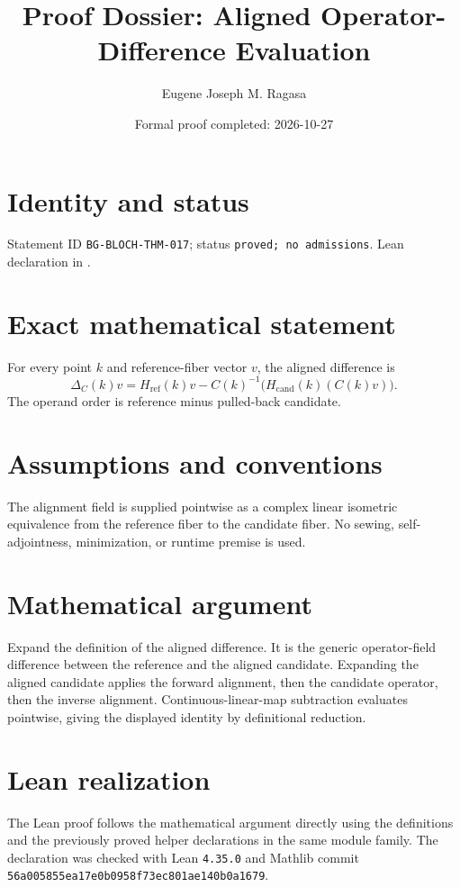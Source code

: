 \documentclass[11pt]{article}
\title{Proof Dossier: Aligned Operator-Difference Evaluation}
\author{Eugene Joseph M. Ragasa}
\date{Formal proof completed: 2026-10-27}
\begin{document}
\raggedright
\maketitle

\section{Identity and status}
Statement ID \texttt{BG-BLOCH-THM-017}; status \texttt{proved; no admissions}.  Lean declaration
 in
.

\section{Exact mathematical statement}
For every point $k$ and reference-fiber vector $v$, the aligned difference is
\[
 \Delta_C(k)v
 =H_{\mathrm{ref}}(k)v
  -C(k)^{-1}\bigl(H_{\mathrm{cand}}(k)(C(k)v)\bigr).
\]
The operand order is reference minus pulled-back candidate.

\section{Assumptions and conventions}
The alignment field is supplied pointwise as a complex linear isometric equivalence from the reference fiber to the candidate fiber.  No sewing, self-adjointness, minimization, or runtime premise is used.

\section{Mathematical argument}
Expand the definition of the aligned difference.  It is the generic operator-field difference between the reference and the aligned candidate.  Expanding the aligned candidate applies the forward alignment, then the candidate operator, then the inverse alignment.  Continuous-linear-map subtraction evaluates pointwise, giving the displayed identity by definitional reduction.

\section{Lean realization}
The Lean proof follows the mathematical argument directly using the definitions and the
previously proved helper declarations in the same module family.  The declaration was checked
with Lean \texttt{4.35.0} and Mathlib commit \texttt{56a005855ea17e0b0958f73ec801ae140b0a1679}.
\end{document}
